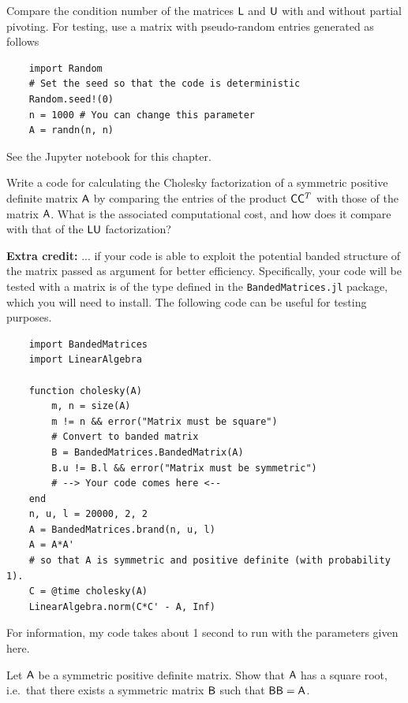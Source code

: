 \begin{compexercise}
    \label{exercise:linear_lu_with_partial_pivoting}
    Compare the condition number of the matrices $\mathsf L$ and $\mathsf U$ with and without partial pivoting.
    For testing, use a matrix with pseudo-random entries generated as follows
    \begin{verbatim}
    import Random
    # Set the seed so that the code is deterministic
    Random.seed!(0)
    n = 1000 # You can change this parameter
    A = randn(n, n)
    \end{verbatim}
\end{compexercise}
\begin{solution}
    See the Jupyter notebook for this chapter.
\end{solution}

\begin{compexercise}
    \label{exercise:linear_cholesky}
    Write a code for calculating the Cholesky factorization of a symmetric positive definite matrix $\mathsf A$ by comparing the entries of the product $\mathsf C \mathsf C^T$ with those of the matrix $\mathsf A$.
    What is the associated computational cost,
    and how does it compare with that of the $\mathsf L \mathsf U$ factorization?

    \noindent \textbf{Extra credit:} ... if your code is able to exploit the potential banded structure of the matrix passed as argument for better efficiency.
    Specifically, your code will be tested with a matrix is of the type  defined in the \texttt{BandedMatrices.jl} package,
    which you will need to install.
    The following code can be useful for testing purposes.
    \begin{verbatim}
    import BandedMatrices
    import LinearAlgebra

    function cholesky(A)
        m, n = size(A)
        m != n && error("Matrix must be square")
        # Convert to banded matrix
        B = BandedMatrices.BandedMatrix(A)
        B.u != B.l && error("Matrix must be symmetric")
        # --> Your code comes here <--
    end
    n, u, l = 20000, 2, 2
    A = BandedMatrices.brand(n, u, l)
    A = A*A'
    # so that A is symmetric and positive definite (with probability 1).
    C = @time cholesky(A)
    LinearAlgebra.norm(C*C' - A, Inf)
    \end{verbatim}
    For information, my code takes about 1 second to run with the parameters given here.
\end{compexercise}

\begin{exercise}
    \label{exercise:matrix_square_root}
    Let $\mathsf A$ be a symmetric positive definite matrix.
    Show that $\mathsf A$ has a square root, i.e.\ that there exists a symmetric matrix $\mathsf B$ such that $\mathsf B \mathsf B = \mathsf A$.
\end{exercise}


